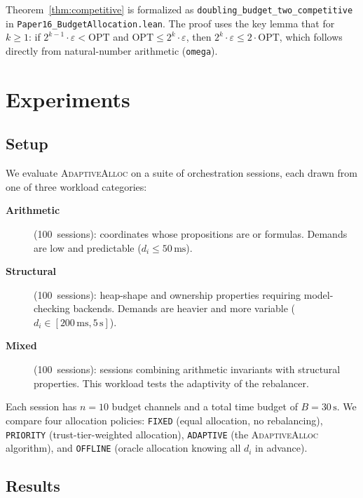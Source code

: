 \documentclass[11pt]{article}
\providecommand{\OPT}{\mathrm{OPT}}           %
\providecommand{\AdaptAlloc}{\textsc{AdaptiveAlloc}}   %
\begin{document}
\begin{remark}
Theorem~\ref{thm:competitive} is formalized as
\texttt{doubling\_budget\_two\_competitive} in
\texttt{Paper16\_BudgetAllocation.lean}.  The proof uses the
key lemma that for $k \ge 1$:
if $2^{k-1} \cdot \varepsilon < \OPT$ and $\OPT \le 2^k \cdot \varepsilon$,
then $2^k \cdot \varepsilon \le 2 \cdot \OPT$,
which follows directly from natural-number arithmetic (\texttt{omega}).
\end{remark}

\section{Experiments}\label{sec:experiments}

\subsection{Setup}

We evaluate \AdaptAlloc{} on a suite of \numcases{} \JuGeo{}
orchestration sessions, each drawn from one of three workload
categories:

\begin{description}
  \item[\textbf{Arithmetic}] (100~sessions): coordinates whose
    propositions are \QFLIA{} or \QFLRA{} formulas.  Demands are
    low and predictable ($d_i \le 50\,\mathrm{ms}$).
  \item[\textbf{Structural}] (100~sessions): heap-shape and ownership
    properties requiring model-checking backends.  Demands are
    heavier and more variable ($d_i \in [200\,\mathrm{ms}, 5\,\mathrm{s}]$).
  \item[\textbf{Mixed}] (100~sessions): sessions combining arithmetic
    invariants with structural properties.  This workload tests the
    adaptivity of the rebalancer.
\end{description}

Each session has $n = 10$ budget channels and a total time budget
of $B = 30\,\mathrm{s}$.  We compare four allocation policies:
\texttt{FIXED} (equal allocation, no rebalancing),
\texttt{PRIORITY} (trust-tier-weighted allocation),
\texttt{ADAPTIVE} (the \AdaptAlloc{} algorithm), and
\texttt{OFFLINE} (oracle allocation knowing all $d_i$ in advance).

\subsection{Results}
\end{document}
